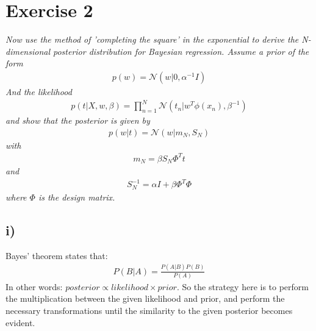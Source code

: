 \documentclass[11pt]{scrartcl} %
\begin{document}
\vspace{5mm}
\section*{Exercise 2}
         {\it Now use the method of ’completing the square’ in the exponential to derive the N-dimensional posterior distribution for Bayesian regression. Assume a prior of the form
           \begin{align*}
             p(w) = \mathcal{N}(w|0, \alpha^{-1}I)
           \end{align*}
           And the likelihood
           \begin{align*}
             p(t|X,w,\beta) = \prod_{n=1}^N\mathcal{N}(t_n|w^T\phi(x_n), \beta^{-1})
           \end{align*}
           and show that the posterior is given by
           \begin{align*}
             p(w|t) = \mathcal{N}(w|m_N, S_N)
           \end{align*}
           with
           \begin{align*}
             m_N = \beta S_N \Phi^Tt
           \end{align*}
           and
           \begin{align*}
             S_N^{-1} = \alpha I + \beta \Phi^T\Phi
           \end{align*}
           where \(\Phi\) is the design matrix. }
         
         \subsection*{i)}
         Bayes' theorem states that:
         \begin{align*}
           P(B|A) = \frac{P(A|B)P(B)}{P(A)}
         \end{align*}
         In other words: \(posterior \propto likelihood \times prior\).  So the strategy here is to perform the multiplication between the given likelihood and prior, and perform the necessary transformations until the similarity to the given posterior becomes evident.
\end{document}
